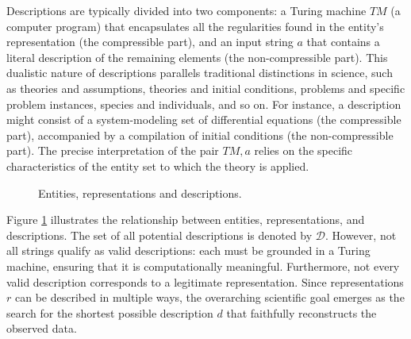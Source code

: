 Descriptions are typically divided into two components: a Turing machine $TM$ (a computer program) that encapsulates all the regularities found in the entity's representation (the compressible part), and an input string $a$ that contains a literal description of the remaining elements (the non-compressible part). This dualistic nature of descriptions parallels traditional distinctions in science, such as theories and assumptions, theories and initial conditions, problems and specific problem instances, species and individuals, and so on. For instance, a description might consist of a system-modeling set of differential equations (the compressible part), accompanied by a compilation of initial conditions (the non-compressible part). The precise interpretation of the pair $TM, a$ relies on the specific characteristics of the entity set to which the theory is applied.

\begin{figure}[t]
\centering
{}
\caption{\label{fig:entities_topics_models}Entities, representations and descriptions.}
\end{figure}

Figure \ref{fig:entities_topics_models} illustrates the relationship between entities, representations, and descriptions. The set of all potential descriptions is denoted by $\mathcal{D}$. However, not all strings qualify as valid descriptions: each must be grounded in a Turing machine, ensuring that it is computationally meaningful. Furthermore, not every valid description corresponds to a legitimate representation. Since representations $r$ can be described in multiple ways, the overarching scientific goal emerges as the search for the shortest possible description $d$ that faithfully reconstructs the observed data.

